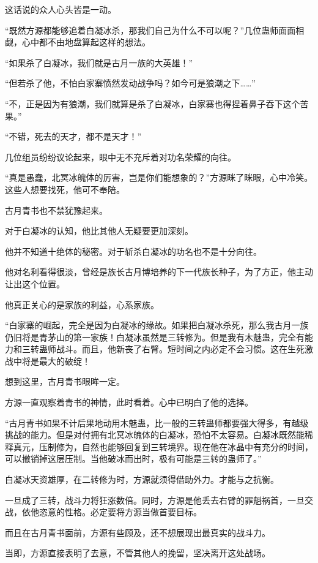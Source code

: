 \begin{this_body}
这话说的众人心头皆是一动。

“既然方源都能够追着白凝冰杀，那我们自己为什么不可以呢？”几位蛊师面面相觑，心中都不由地盘算起这样的想法。

“如果杀了白凝冰，我们就是古月一族的大英雄！”

“但若杀了他，不怕白家寨愤然发动战争吗？如今可是狼潮之下……”

“不，正是因为有狼潮，我们就算是杀了白凝冰，白家寨也得捏着鼻子吞下这个苦果。”

“不错，死去的天才，都不是天才！”

几位组员纷纷议论起来，眼中无不充斥着对功名荣耀的向往。

“真是愚蠢，北冥冰魄体的厉害，岂是你们能想象的？”方源眯了眯眼，心中冷笑。这些人想要找死，他可不奉陪。

古月青书也不禁犹豫起来。

对于白凝冰的认知，他比其他人无疑要更加深刻。

他并不知道十绝体的秘密。对于斩杀白凝冰的功名也不是十分向往。

他对名利看得很淡，曾经是族长古月博培养的下一代族长种子，为了方正，他主动让出这个位置。

他真正关心的是家族的利益，心系家族。

“白家寨的崛起，完全是因为白凝冰的缘故。如果把白凝冰杀死，那么我古月一族仍旧将是青茅山的第一家族！白凝冰虽然是三转修为。但是我有木魅蛊，完全有能力和三转蛊师战斗。而且，他新丧了右臂。短时间之内必定不会习惯。这在生死激战中将是最大的破绽！

想到这里，古月青书眼眸一定。

方源一直观察着青书的神情，此时看着。心中已明白了他的选择。

“古月青书如果不计后果地动用木魅蛊，比一般的三转蛊师都要强大得多，有越级挑战的能力。但是对付拥有北冥冰魄体的白凝冰，恐怕不太容易。白凝冰既然能稀释真元，压制修为，自然也能够回复到三转境界。现在他在冰晶中有充分的时间，可以撤销掉这层压制。当他破冰而出时，极有可能是三转的蛊师了。”

白凝冰天资雄厚，在二转修为时，方源就须得借助外力。才能与之抗衡。

一旦成了三转，战斗力将狂涨数倍。同时，方源是他丢去右臂的罪魁祸首，一旦交战，依他恣意的性格。必定要将方源当做首要目标。

而且在古月青书面前，方源有些顾及，还不想展现出最真实的战斗力。

当即，方源直接表明了去意，不管其他人的挽留，坚决离开这处战场。


\end{this_body}
